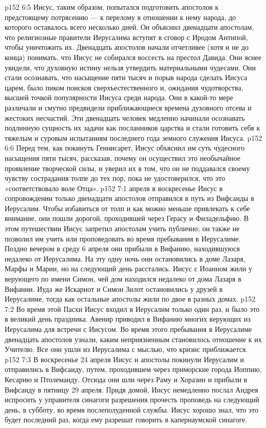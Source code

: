 \vs p152 6:5 Иисус, таким образом, попытался подготовить апостолов к предстоящему потрясению --- к перелому в отношении к нему народа, до которого оставалось всего несколько дней. Он объяснил двенадцати апостолам, что религиозные правители Иерусалима вступят в сговор с Иродом Антипой, чтобы уничтожить их. Двенадцать апостолов начали отчетливее (хотя и не до конца) понимать, что Иисус не собирался воссесть на престол Давида. Они яснее увидели, что духовную истину нельзя утвердить материальными чудесами. Они стали осознавать, что насыщение пяти тысяч и порыв народа сделать Иисуса царем, было пиком поисков сверхъестественного и, ожидания чудотворства, высшей точкой популярности Иисуса среди народа. Они в какой\hyp{}то мере различали и смутно предвидели приближающиеся времена духовного отсева и жестоких несчастий. Эти двенадцать человек медленно начинали осознавать подлинную сущность их задачи как посланников царства и стали готовить себя к тяжелым и суровым испытаниям последнего года земного служения Иисуса.
\vs p152 6:6 \pc Перед тем, как покинуть Геннисарет, Иисус объяснил им суть чудесного насыщения пяти тысяч, рассказав, почему он осуществил это необычайное проявление творческой силы, и уверил их в том, что он не поддавался своему чувству сострадания толпе до тех пор, пока не удостоверился, что это «соответствовало воле Отца».
\vs p152 7:1 апреля в воскресенье Иисус в сопровождении только двенадцати апостолов отправился в путь из Вифсаиды в Иерусалим. Чтобы избавиться от толп и как можно меньше привлекать к себе внимание, они пошли дорогой, проходившей через Герасу и Филадельфию. В этом путешествии Иисус запретил апостолам учить публично; он также не позволил им учить или проповедовать во время пребывания в Иерусалиме. Поздно вечером в среду 6 апреля они прибыли в Вифанию, находившуюся недалеко от Иерусалима. На эту одну ночь они остановились в доме Лазаря, Марфы и Марии, но на следующий день расстались. Иисус с Иоанном жили у верующего по имени Симон, чей дом находился недалеко от дома Лазаря в Вифании. Иуда же Искариот и Симон Зилот остановились у друзей в Иерусалиме, тогда как остальные апостолы жили по двое в разных домах.
\vs p152 7:2 Во время этой Пасхи Иисус входил в Иерусалим только один раз, и было это в великий день праздника. Авенир приводил в Вифанию многих верующих из Иерусалима для встречи с Иисусом. Во время этого пребывания в Иерусалиме двенадцать апостолов узнали, каким неприязненным становилось отношение к их Учителю. Все они ушли из Иерусалима с мыслью, что кризис приближается.
\vs p152 7:3 В воскресенье 24 апреля Иисус и апостолы покинули Иерусалим и отправились в Вифсаиду, путем, проходившем через приморские города Иоппию, Кесарию и Птолемаиду. Отсюда они шли через Раму и Хоразин и прибыли в Вифсаиду в пятницу 29 апреля. Придя домой, Иисус немедленно послал Андрея испросить у управителя синагоги разрешения прочесть проповедь на следующий день, в субботу, во время послеполуденной службы. Иисус хорошо знал, что это будет последний раз, когда ему разрешат говорить в капернаумской синагоге.
